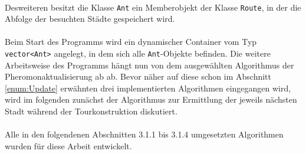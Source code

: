 \documentclass[doktyp=barbeit, sprache=german]{TUBAFarbeiten}
\begin{document}
\\Desweiteren besitzt die Klasse \texttt{Ant} ein Memberobjekt der Klasse \texttt{Route}, in der die Abfolge der besuchten Städte gespeichert wird. 
\\\\Beim Start des Programms wird ein dynamischer Container vom Typ \texttt{vector<Ant>} angelegt, in dem sich alle \texttt{Ant}-Objekte befinden. Die weitere Arbeitsweise des Programms hängt nun von dem ausgewählten Algorithmus der Pheromonaktualisierung ab ab. Bevor näher auf diese schon im Abschnitt \ref{enum:Update} erwähnten drei implementierten Algorithmen eingegangen wird, wird im folgenden zunächst der Algorithmus zur Ermittlung der jeweils nächsten Stadt während der Tourkonstruktion diskutiert. 
\\\\Alle in den folgendenen Abschnitten 3.1.1 bis 3.1.4 umgesetzten Algorithmen wurden für diese Arbeit entwickelt.
\end{document}
